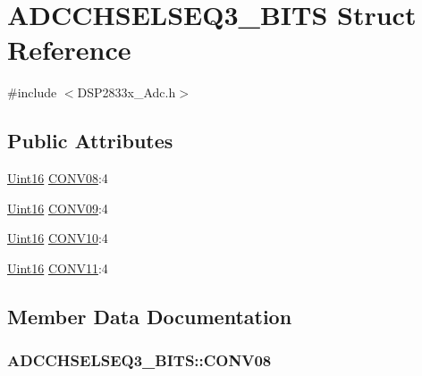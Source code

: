 \hypertarget{struct_a_d_c_c_h_s_e_l_s_e_q3___b_i_t_s}{}\section{A\+D\+C\+C\+H\+S\+E\+L\+S\+E\+Q3\+\_\+\+B\+I\+T\+S Struct Reference}
\label{struct_a_d_c_c_h_s_e_l_s_e_q3___b_i_t_s}


{\ttfamily \#include $<$D\+S\+P2833x\+\_\+\+Adc.\+h$>$}

\subsection*{Public Attributes}
\begin{DoxyCompactItemize}
\item 
\hyperlink{_d_s_p2833x___device_8h_a59a9f6be4562c327cbfb4f7e8e18f08b}{Uint16} \hyperlink{struct_a_d_c_c_h_s_e_l_s_e_q3___b_i_t_s_a4c183f1a2bffe1c4e2cbe8492bdf1065}{C\+O\+N\+V08}\+:4
\item 
\hyperlink{_d_s_p2833x___device_8h_a59a9f6be4562c327cbfb4f7e8e18f08b}{Uint16} \hyperlink{struct_a_d_c_c_h_s_e_l_s_e_q3___b_i_t_s_a97ad10432326ae7a6204f76ed82f481c}{C\+O\+N\+V09}\+:4
\item 
\hyperlink{_d_s_p2833x___device_8h_a59a9f6be4562c327cbfb4f7e8e18f08b}{Uint16} \hyperlink{struct_a_d_c_c_h_s_e_l_s_e_q3___b_i_t_s_aed8e30907dd488b82f3af1018c3a21c1}{C\+O\+N\+V10}\+:4
\item 
\hyperlink{_d_s_p2833x___device_8h_a59a9f6be4562c327cbfb4f7e8e18f08b}{Uint16} \hyperlink{struct_a_d_c_c_h_s_e_l_s_e_q3___b_i_t_s_aa4c833d68f47e6ce682d94a1287ef9c6}{C\+O\+N\+V11}\+:4
\end{DoxyCompactItemize}


\subsection{Member Data Documentation}
\hypertarget{struct_a_d_c_c_h_s_e_l_s_e_q3___b_i_t_s_a4c183f1a2bffe1c4e2cbe8492bdf1065}{}
\subsubsection[{C\+O\+N\+V08}]{ A\+D\+C\+C\+H\+S\+E\+L\+S\+E\+Q3\+\_\+\+B\+I\+T\+S\+::\+C\+O\+N\+V08}\label{struct_a_d_c_c_h_s_e_l_s_e_q3___b_i_t_s_a4c183f1a2bffe1c4e2cbe8492bdf1065}
\hypertarget{struct_a_d_c_c_h_s_e_l_s_e_q3___b_i_t_s_a97ad10432326ae7a6204f76ed82f481c}{}
